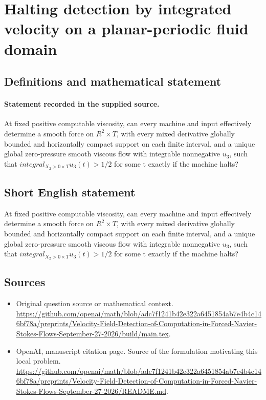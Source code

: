 \documentclass[11pt]{article}
\begin{document}
\section*{Halting detection by integrated velocity on a planar-periodic fluid domain}\label{statement}
\subsection{Definitions and mathematical statement}
\paragraph{Statement recorded in the supplied source.}
At fixed positive computable viscosity, can every machine and input effectively determine a smooth force on $R^2×T$, with every mixed derivative globally bounded and horizontally compact support on each finite interval, and a unique global zero-pressure smooth viscous flow with integrable nonnegative $u_3$, such that $integral_{{X_2>0}×T}u_3(t)>1/2$ for some t exactly if the machine halts?
\subsection{Short English statement}
At fixed positive computable viscosity, can every machine and input effectively determine a smooth force on $R^2×T$, with every mixed derivative globally bounded and horizontally compact support on each finite interval, and a unique global zero-pressure smooth viscous flow with integrable nonnegative $u_3$, such that $integral_{{X_2>0}×T}u_3(t)>1/2$ for some t exactly if the machine halts?
\subsection{Sources}
\begin{itemize}
\item[S1] Original question source or mathematical context.
\url{https://github.com/openai/math/blob/adc7f1241b42e322a6451854ab7e4b4c146bf78a/preprints/Velocity-Field-Detection-of-Computation-in-Forced-Navier-Stokes-Flows-September-27-2026/build/main.tex}.
\item[S2] OpenAI, manuscript citation page. Source of the formulation motivating this local problem.
\url{https://github.com/openai/math/blob/adc7f1241b42e322a6451854ab7e4b4c146bf78a/preprints/Velocity-Field-Detection-of-Computation-in-Forced-Navier-Stokes-Flows-September-27-2026/README.md}.
\end{itemize}
\end{document}
